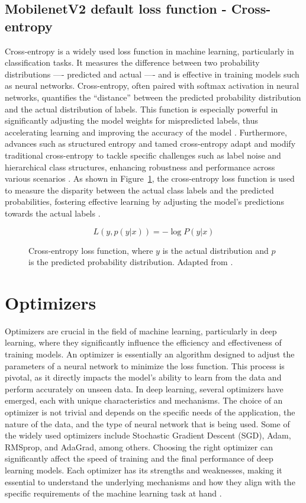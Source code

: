 \subsection{MobilenetV2 default loss function - Cross-entropy}
Cross-entropy is a widely used loss function in machine learning, particularly in classification tasks. It measures the difference between two probability distributions ---- predicted and actual ---- and is effective in training models such as neural networks. Cross-entropy, often paired with softmax activation in neural networks, quantifies the ``distance'' between the predicted probability distribution and the actual distribution of labels. This function is especially powerful in significantly adjusting the model weights for mispredicted labels, thus accelerating learning and improving the accuracy of the model \cite{mao2023crossentropy, lucena2022structured}. Furthermore, advances such as structured entropy and tamed cross-entropy adapt and modify traditional cross-entropy to tackle specific challenges such as label noise and hierarchical class structures, enhancing robustness and performance across various scenarios \cite{martinez2018tamed, li2020gradient}. As shown in Figure~\ref{fig:cross_entropy}, the cross-entropy loss function is used to measure the disparity between the actual class labels and the predicted probabilities, fostering effective learning by adjusting the model's predictions towards the actual labels \cite{Wang2020ComprehensiveSF}.

\begin{figure}[h]
    \centering
    \[
    L(y, p(y|x)) = -\log P(y|x)
    \]
    \caption{Cross-entropy loss function, where $y$ is the actual distribution and $p$ is the predicted probability distribution. Adapted from \cite{Wang2020ComprehensiveSF}.}
    \label{fig:cross_entropy}
\end{figure}

\section{Optimizers}

Optimizers are crucial in the field of machine learning, particularly in deep learning, where they significantly influence the efficiency and effectiveness of training models. An optimizer is essentially an algorithm designed to adjust the parameters of a neural network to minimize the loss function. This process is pivotal, as it directly impacts the model's ability to learn from the data and perform accurately on unseen data. In deep learning, several optimizers have emerged, each with unique characteristics and mechanisms. The choice of an optimizer is not trivial and depends on the specific needs of the application, the nature of the data, and the type of neural network that is being used. Some of the widely used optimizers include Stochastic Gradient Descent (SGD), Adam, RMSprop, and AdaGrad, among others. Choosing the right optimizer can significantly affect the speed of training and the final performance of deep learning models. Each optimizer has its strengths and weaknesses, making it essential to understand the underlying mechanisms and how they align with the specific requirements of the machine learning task at hand
\cite{Perin2020Influence}.


